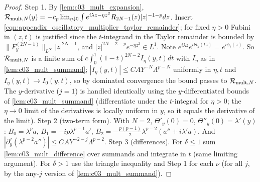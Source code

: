 \begin{proof}
  Step 1. By \cref{lem:c03_mult_expansion}, $\mathcal{R}_{\textup{mult},N}(y)=-c_p\lim_{\eta\downarrow0}\int e^{i\lambda z-\eta z^2}R_{2N-1}(z)|z|^{-1-p}dz$. Insert \eqref{eqn:appendix_oscillatory_multiplier_taylor_remainder}; for fixed $\eta>0$ Fubini in $(z,t)$ is justified since the $t$-integrand in the Taylor remainder is bounded by $\|F_y^{(2N-1)}\|_{L^\infty}|z|^{2N-1}$, and $|z|^{2N-2-p}e^{-\eta z^2}\in L^1$. Note $e^{i\lambda z}e^{i\Theta_y(tz)}=e^{i\phi_t(z)}$.
  So $\mathcal{R}_{\textup{mult},N}$ is a finite sum of $c\int_0^1(1-t)^{2N-2}I_\eta(y,t)dt$ with $I_\eta$ as in \cref{lem:c03_mult_summand}; $|I_\eta(y,t)|\le CAY^{-N}\Lambda^{p-N}$ uniformly in $\eta,t$ and $I_\eta(y,t)\to I_0(y,t)$, so by dominated convergence the bound passes to $\mathcal{R}_{\textup{mult},N}$. The $y$-derivative ($j=1$) is handled identically using the $y$-differentiated bounds of \cref{lem:c03_mult_summand} (differentiate under the $t$-integral for $\eta>0$; the $\eta\to0$ limit of the derivatives is locally uniform in $y$, so it equals the derivative of the limit).
  Step 2 (two-term form). With $N=2$, $\Theta'_y(0)=0$, $\Theta''_y(0)=\lambda'(y)$: $B_0=\lambda^pa$, $B_1=-ip\lambda^{p-1}a'$, $B_2=-\frac{p(p-1)}2\lambda^{p-2}(a''+i\lambda'a)$. And $|\partial_y^j(\lambda^{p-2}a'')|\le CAY^{-2-j}\Lambda^{p-2}$.
  Step 3 (differences). For $\delta\le1$ sum \cref{lem:c03_mult_difference} over summands and integrate in $t$ (same limiting argument). For $\delta>1$ use the triangle inequality and Step 1 for each $\nu$ (for all $j$, by the any-$j$ version of \cref{lem:c03_mult_summand}).
\end{proof}
